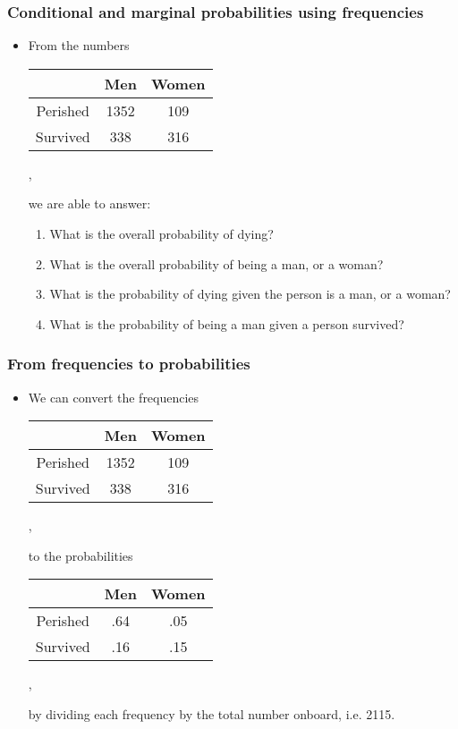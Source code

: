 \documentclass[10pt,xcolor=dvipsnames,serif,professionalfont]{beamer} %
\begin{document}
\begin{frame}
\frametitle{Conditional and marginal probabilities using frequencies}
\begin{itemize}
\item From the numbers
\begin{center}
{\scriptsize
\begin{tabular}{c|cc}
& Men & Women \\\hline
Perished & 1352 & 109 \\
Survived & 338 & 316 \\
\end{tabular},
}
\end{center}
we are able to answer:
\begin{enumerate}
\item What is the overall probability of dying?
\item What is the overall probability of being a man, or a woman?
\item What is the probability of dying given the person is a man, or a woman?
\item What is the probability of being a man given a person survived?
\end{enumerate}

\end{itemize}
\end{frame}

\begin{frame}
\frametitle{From frequencies to probabilities}
\begin{itemize}
\item We can convert the frequencies 
\begin{center}
\begin{tabular}{c|cc}
& Men & Women \\\hline
Perished & 1352 & 109 \\
Survived & 338 & 316 \\
\end{tabular},
\end{center}
to the probabilities 
\begin{center}
\begin{tabular}{c|cc}
& Men & Women \\\hline
Perished & .64 & .05 \\
Survived & .16 & .15 \\
\end{tabular},
\end{center}
by dividing each frequency by the total number onboard, i.e. 2115.
\end{itemize}
\end{frame}
\end{document}
